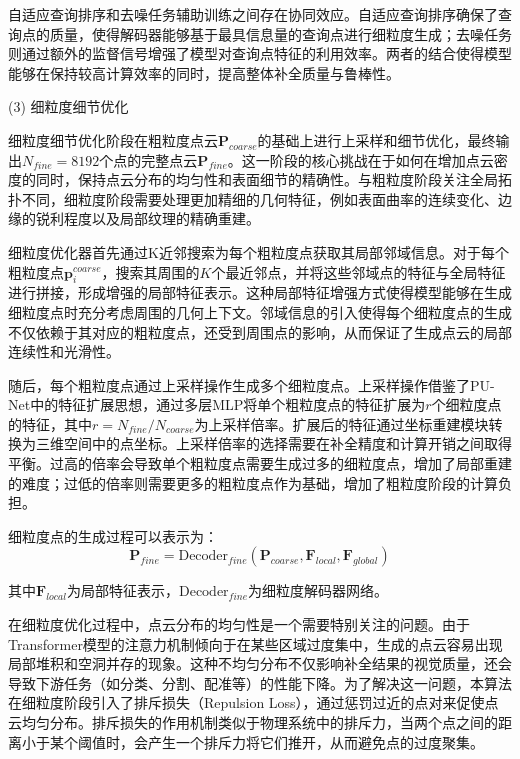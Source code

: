 自适应查询排序和去噪任务辅助训练之间存在协同效应。自适应查询排序确保了查询点的质量，使得解码器能够基于最具信息量的查询点进行细粒度生成；去噪任务则通过额外的监督信号增强了模型对查询点特征的利用效率。两者的结合使得模型能够在保持较高计算效率的同时，提高整体补全质量与鲁棒性。

(3) 细粒度细节优化

细粒度细节优化阶段在粗粒度点云$\mathbf{P}_{coarse}$的基础上进行上采样和细节优化，最终输出$N_{fine}=8192$个点的完整点云$\mathbf{P}_{fine}$。这一阶段的核心挑战在于如何在增加点云密度的同时，保持点云分布的均匀性和表面细节的精确性。与粗粒度阶段关注全局拓扑不同，细粒度阶段需要处理更加精细的几何特征，例如表面曲率的连续变化、边缘的锐利程度以及局部纹理的精确重建。

细粒度优化器首先通过K近邻搜索为每个粗粒度点获取其局部邻域信息。对于每个粗粒度点$\mathbf{p}_i^{coarse}$，搜索其周围的$K$个最近邻点，并将这些邻域点的特征与全局特征进行拼接，形成增强的局部特征表示。这种局部特征增强方式使得模型能够在生成细粒度点时充分考虑周围的几何上下文。邻域信息的引入使得每个细粒度点的生成不仅依赖于其对应的粗粒度点，还受到周围点的影响，从而保证了生成点云的局部连续性和光滑性。

随后，每个粗粒度点通过上采样操作生成多个细粒度点。上采样操作借鉴了PU-Net\cite{yu2018punet}中的特征扩展思想，通过多层MLP将单个粗粒度点的特征扩展为$r$个细粒度点的特征，其中$r = N_{fine} / N_{coarse}$为上采样倍率。扩展后的特征通过坐标重建模块转换为三维空间中的点坐标。上采样倍率的选择需要在补全精度和计算开销之间取得平衡。过高的倍率会导致单个粗粒度点需要生成过多的细粒度点，增加了局部重建的难度；过低的倍率则需要更多的粗粒度点作为基础，增加了粗粒度阶段的计算负担。

细粒度点的生成过程可以表示为：
\begin{equation}
\mathbf{P}_{fine} = \text{Decoder}_{fine}(\mathbf{P}_{coarse}, \mathbf{F}_{local}, \mathbf{F}_{global})
\end{equation}

其中$\mathbf{F}_{local}$为局部特征表示，$\text{Decoder}_{fine}$为细粒度解码器网络。

在细粒度优化过程中，点云分布的均匀性是一个需要特别关注的问题。由于Transformer模型的注意力机制倾向于在某些区域过度集中，生成的点云容易出现局部堆积和空洞并存的现象。这种不均匀分布不仅影响补全结果的视觉质量，还会导致下游任务（如分类、分割、配准等）的性能下降。为了解决这一问题，本算法在细粒度阶段引入了排斥损失（Repulsion Loss），通过惩罚过近的点对来促使点云均匀分布。排斥损失的作用机制类似于物理系统中的排斥力，当两个点之间的距离小于某个阈值时，会产生一个排斥力将它们推开，从而避免点的过度聚集。

